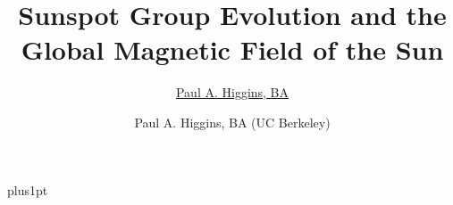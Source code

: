 \documentclass[twoside,11pt]{Latex/Classes/PhDthesisPSnPDF}
\title{Sunspot Group Evolution and the Global Magnetic Field of the Sun}
\author{\href{mailto:pohuigin@gmail.com}{Paul A. Higgins, BA}}
\author{Paul A. Higgins, BA (UC Berkeley)}
\begin{document}

\renewcommand\baselinestretch{1.2}
\baselineskip=18pt plus1pt

\doublespacing

\maketitle  %

%










\frontmatter
\singlespacing
	


\singlespacing
	

%   
\singlespacing
	

\singlespacing
	
\end{document}
